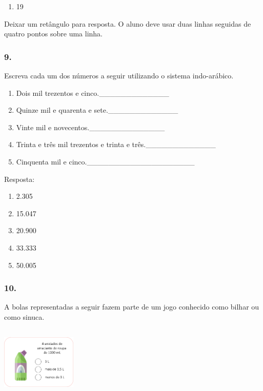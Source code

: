 \begin{enumerate}
\begin{enumerate}
\def\labelenumi{\alph{enumi})}
\item
  19
\end{enumerate}

Deixar um retângulo para resposta.
O aluno deve usar duas linhas seguidas de quatro pontos sobre uma linha.


\subsubsection{9.}\label{section-8}

Escreva cada um dos números a seguir utilizando o sistema indo-arábico.

\begin{enumerate}
\def\labelenumi{\alph{enumi})}
\item
  Dois mil trezentos e cinco.\_\_\_\_\_\_\_\_\_\_\_\_\_
\item
  Quinze mil e quarenta e sete.\_\_\_\_\_\_\_\_\_\_\_\_\_
\item
  Vinte mil e novecentos.\_\_\_\_\_\_\_\_\_\_\_\_\_\_
\item
  Trinta e três mil trezentos e trinta e três.\_\_\_\_\_\_\_\_\_\_\_\_\_
\item
  Cinquenta mil e cinco.\_\_\_\_\_\_\_\_\_\_\_\_\_\_\_\_\_\_\_\_
\end{enumerate}

Resposta:

\begin{enumerate}
\def\labelenumi{\alph{enumi})}
\item
  2.305
\item
  15.047
\item
  20.900
\item
  33.333
\item
  50.005
\end{enumerate}

\subsubsection{10.}\label{section-9}

A bolas representadas a seguir fazem parte de um jogo conhecido como
bilhar ou como sinuca.

\includegraphics[width=1.40833in,height=1.33406in]{media/image21.png}


\end{enumerate}
